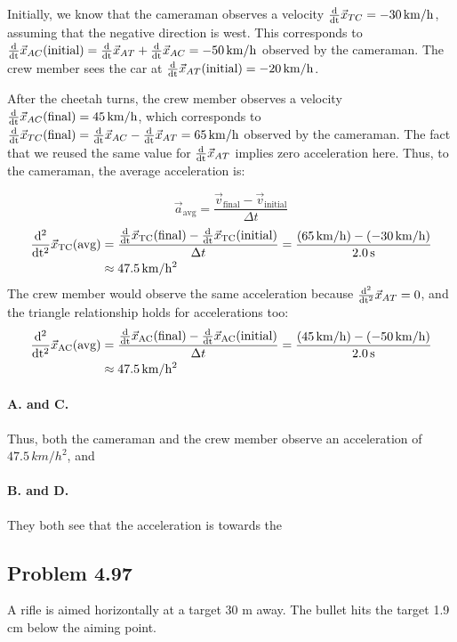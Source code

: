 \documentclass[12pt]{article}
\newcommand{\tderiv}{{\frac{\rm{d}}{\rm{d}t}}}
\newcommand{\tsderiv}{{\frac{\rm{d}^2}{\rm{d}t^2}}}
\begin{document}
Initially, we know that the cameraman observes a velocity $\tderiv \vec{x}_{TC} = -30\,\si{km/h}$, assuming that the negative direction is west. This corresponds to $\tderiv \vec{x}_{AC}\text{(initial)} = \tderiv \vec{x}_{AT} + \tderiv \vec{x}_{AC} = -50\,\si{km/h}$ observed by the cameraman. The crew member sees the car at $\tderiv \vec{x}_{AT}\text{(initial)} = -20\,\si{km/h}$. 

After the cheetah turns, the crew member observes a velocity $\tderiv \vec{x}_{AC}\text{(final)} = 45\,\si{km/h}$, which corresponds to $\tderiv \vec{x}_{TC}\text{(final)} = \tderiv \vec{x}_{AC} - \tderiv \vec{x}_{AT} = 65\,\si{km/h}$ observed by the cameraman. The fact that we reused the same value for $\tderiv \vec{x}_{AT}$ implies zero acceleration here. Thus, to the cameraman, the average acceleration is:

\[
\vec{a}_\text{avg} = \frac{\vec{v}_\text{final} - \vec{v}_\text{initial}}{\Delta t}
\]
\begin{align*}
\tsderiv \vec{x}_\text{TC} \text{(avg)} &= \frac{\tderiv \vec{x}_\text{TC} \text{(final)} - \tderiv \vec{x}_\text{TC} \text{(initial)}}{\Delta t} =
\frac{(65\,\si{km/h}) - (-30\,\si{km/h})}{2.0\,\si{s}}
\\&\approx{47.5\,\si{km/h^2}}
\end{align*}
The crew member would observe the same acceleration because $\tsderiv \vec{x}_{AT} = 0$, and the triangle relationship holds for accelerations too:
\begin{align*}
\tsderiv \vec{x}_\text{AC} \text{(avg)} &= \frac{\tderiv \vec{x}_\text{AC} \text{(final)} - \tderiv \vec{x}_\text{AC} \text{(initial)}}{\Delta t} =
\frac{(45\,\si{km/h}) - (-50\,\si{km/h})}{2.0\,\si{s}}
\\&\approx{47.5\,\si{km/h^2}}
\end{align*}

\paragraph{A. and C.} Thus, both the cameraman and the crew member observe an acceleration of $\boxed{47.5\,\si{km/h^2}}$, and

\paragraph{B. and D.} They both see that the acceleration is towards the 


\subsection{Problem 4.97}
A rifle is aimed horizontally at a target 30 m away. The bullet hits the target 1.9 cm below the aiming point. \newline
\end{document}
